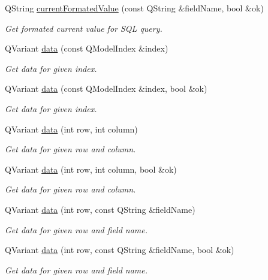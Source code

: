 \begin{DoxyCompactItemize}
Q\-String \hyperlink{classmdt_abstract_sql_table_controller_a43311c27eab3a892fd079164abf3501f}{current\-Formated\-Value} (const Q\-String \&field\-Name, bool \&ok)
\begin{DoxyCompactList}\small\item\em Get formated current value for S\-Q\-L query. \end{DoxyCompactList}\item 
Q\-Variant \hyperlink{classmdt_abstract_sql_table_controller_a1801a01c0ce073c2e389b20f58a3d3ff}{data} (const Q\-Model\-Index \&index)
\begin{DoxyCompactList}\small\item\em Get data for given index. \end{DoxyCompactList}\item 
Q\-Variant \hyperlink{classmdt_abstract_sql_table_controller_a25fec3a81261364e248332a71b01822e}{data} (const Q\-Model\-Index \&index, bool \&ok)
\begin{DoxyCompactList}\small\item\em Get data for given index. \end{DoxyCompactList}\item 
Q\-Variant \hyperlink{classmdt_abstract_sql_table_controller_af1d1cc870f914ee8278884a118325fba}{data} (int row, int column)
\begin{DoxyCompactList}\small\item\em Get data for given row and column. \end{DoxyCompactList}\item 
Q\-Variant \hyperlink{classmdt_abstract_sql_table_controller_a09ac7fcd64c6d75ebbbd15ab30957674}{data} (int row, int column, bool \&ok)
\begin{DoxyCompactList}\small\item\em Get data for given row and column. \end{DoxyCompactList}\item 
Q\-Variant \hyperlink{classmdt_abstract_sql_table_controller_a83e15b11cdbdd9455049454dca6d4331}{data} (int row, const Q\-String \&field\-Name)
\begin{DoxyCompactList}\small\item\em Get data for given row and field name. \end{DoxyCompactList}\item 
Q\-Variant \hyperlink{classmdt_abstract_sql_table_controller_a99a52795749a325b8b96096cffe60866}{data} (int row, const Q\-String \&field\-Name, bool \&ok)
\begin{DoxyCompactList}\small\item\em Get data for given row and field name. \end{DoxyCompactList}\item 

\end{DoxyCompactItemize}
